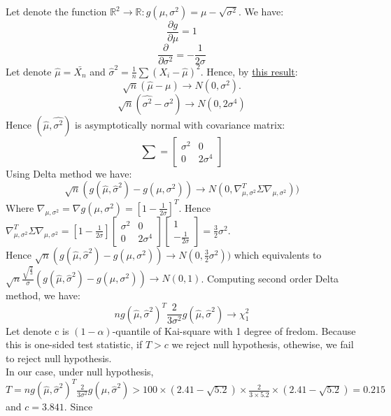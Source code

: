 \documentclass[10pt]{article}
\newenvironment{problem}[2][Problem]{\begin{trivlist}
\item[\hskip \labelsep {\bfseries #1}\hskip \labelsep {\bfseries #2.}]}{\end{trivlist}}
\begin{document}
\begin{problem}{3}
Let denote the function $\mathbb{R}^{2} \longrightarrow \mathbb{R}: g(\mu, \sigma^2)=\mu -\sqrt{\sigma^2}$. We have:
\[ \frac{\partial g}{\partial \mu}=1 \]
\[ \frac{\partial}{\partial \sigma^{2}}= -\frac{1}{2\sigma}\]
Let denote $\hat{\mu}=\bar{X_n}$ and $\hat{\sigma}^{2}=\frac{1}{n}\sum(X_i-\hat{\mu})^{2}$. Hence, by \href{https://alecospapadopoulos.files.wordpress.com/2016/03/asympt-distr-of-sample-variance-dichotomous-rvs-technical-report.pdf}{this result}: 
\[ \sqrt{n}(\hat{\mu}-\mu) \longrightarrow N(0, \sigma^2).\]
\[ \sqrt{n}(\hat{\sigma^2}- \sigma^2) \longrightarrow N(0, 2\sigma^{4}) \]
Hence $(\hat{\mu}, \hat{\sigma^2})$ is asymptotically normal with covariance matrix:
\[\sum= 
\begin{bmatrix}
    \sigma^2 & 0\\
    0 & 2\sigma^4
\end{bmatrix}
 \] 
Using Delta method we have: 
\[ \sqrt{n}(g(\hat{\mu}, \hat{\sigma}^2) - g(\mu, \sigma^2)) \longrightarrow N(0, \nabla_{\mu, \sigma^2}^{T} \Sigma \nabla_{\mu, \sigma^2} ))\]
Where $\nabla_{\mu, \sigma^2}= \nabla g(\mu, \sigma^2)=[1 -\frac{1}{2\sigma}]^{T}$. Hence $\nabla_{\mu, \sigma^2}^{T} \Sigma \nabla_{\mu, \sigma^2}=[1 -\frac{1}{2\sigma}]\begin{bmatrix}
    \sigma^2 & 0\\
    0 & 2\sigma^4
\end{bmatrix} 
\begin{bmatrix}
    1 \\
     -\frac{1}{2\sigma}
\end{bmatrix}=\frac{3}{2}\sigma^2$.\\
Hence $ \sqrt{n}(g(\hat{\mu}, \hat{\sigma}^2) - g(\mu, \sigma^2)) \longrightarrow N(0, \frac{3}{2}\sigma^2 )) $ which equivalents to $ \sqrt{n}\frac{\sqrt{\frac{2}{3}}}{\sigma}(g(\hat{\mu}, \hat{\sigma}^2) - g(\mu, \sigma^2)) \longrightarrow N(0, 1)$. Computing second order Delta method, we have:
\[ n g(\hat{\mu}, \hat{\sigma}^2)^{T} \frac{2}{3\sigma^2} g(\hat{\mu}, \hat{\sigma}^2)  \longrightarrow \chi_{1}^{2}\]
Let denote c is $(1-\alpha)$-quantile of Kai-square with 1 degree of fredom. Because this is one-sided test statistic, if $T>c$ we reject null hypothesis, othewise, we fail to reject null hypothesis.\\
In our case, under null hypothesis, $T=n g(\hat{\mu}, \hat{\sigma}^2)^{T} \frac{2}{3\sigma^2} g(\hat{\mu}, \hat{\sigma}^2) >  100 \times (2.41-\sqrt{5.2}) \times \frac{2}{3\times 5.2} \times (2.41-\sqrt{5.2})= 0.215 $ and $c=3.841$. Since $$
\end{problem}
\end{document}
